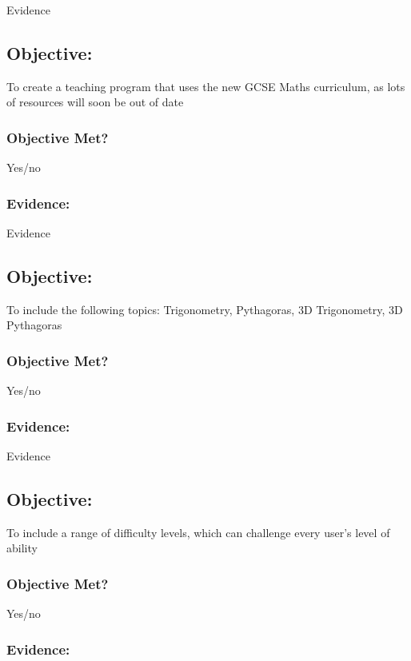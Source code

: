 Evidence

\subsection{Objective: }

To create a teaching program that uses the new GCSE Maths curriculum, as lots of resources will soon be out of date

\subsubsection{Objective Met?}

Yes/no 

\subsubsection{Evidence: }

Evidence

\subsection{Objective: }

To include the following topics: Trigonometry, Pythagoras, 3D Trigonometry, 3D Pythagoras

\subsubsection{Objective Met?}

Yes/no 

\subsubsection{Evidence: }

Evidence

\subsection{Objective: }

To include a range of difficulty levels, which can challenge every user's level of ability

\subsubsection{Objective Met?}

Yes/no 

\subsubsection{Evidence: }

